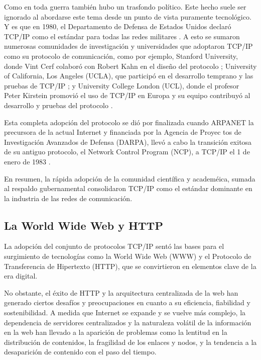Como en toda guerra también hubo un trasfondo político. Este hecho suele ser ignorado al abordarse este tema desde un punto de vista puramente tecnológico.
Y es que en 1980, el Departamento de Defensa de Estados Unidos declaró TCP/IP como el estándar para todas las redes militares \cite{leinerBriefHistoryInternet1999}.
A esto se sumaron numerosas comunidades de investigación y universidades que adoptaron TCP/IP como su protocolo de comunicación, como por ejemplo, Stanford University, donde Vint Cerf colaboró con Robert Kahn en el diseño del protocolo \cite{leinerBriefHistoryInternet1999}; University of California, Los Angeles (UCLA), que participó en el desarrollo temprano y las pruebas de TCP/IP \cite{leinerBriefHistoryInternet1999}; y University College London (UCL), donde el profesor Peter Kirstein promovió el uso de TCP/IP en Europa y su equipo contribuyó al desarrollo y pruebas del protocolo \cite{moriPeterKirsteinObituary2020}.

Esta completa adopción del protocolo se dió por finalizada cuando ARPANET la precursora de la actual Internet y financiada por la Agencia de Proyec
tos de Investigación Avanzados de
Defensa (DARPA), llevó a cabo la transición exitosa de su antiguo protocolo, el Network Control Program (NCP), a TCP/IP el 1 de enero de 1983
\cite{leinerBriefHistoryInternet1999}.

En resumen, la rápida adopción de la comunidad científica y academéica, sumada al respaldo gubernamental consolidaron TCP/IP como el estándar dominante en la industria de las redes de comunicación.

\subsection{La World Wide Web y HTTP}
La adopción del conjunto de protocolos TCP/IP sentó las bases para el surgimiento de tecnologías como la World Wide Web (WWW) y el Protocolo de Transferencia de Hipertexto (HTTP), que se convirtieron en elementos clave de la era digital.


No obstante, el éxito de HTTP y la arquitectura centralizada de la web han generado ciertos desafíos y preocupaciones en cuanto a su eficiencia, fiabilidad y sostenibilidad. A medida que Internet se expande y se vuelve más complejo, la dependencia de servidores centralizados y la naturaleza volátil de la información en la web han llevado a la aparición de problemas como la lentitud en la distribución de contenidos, la fragilidad de los enlaces y nodos, y la tendencia a la desaparición de contenido con el paso del tiempo.


